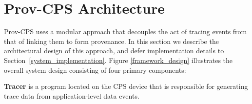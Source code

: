 %
%
%
%
%
%
%
%
% 
%


\section{Prov-CPS Architecture}
Prov-CPS uses a modular approach that decouples the act of tracing events from that of linking them to form provenance. In this section we describe the architectural design of this approach, and defer implementation details to Section~\ref{system_implementation}.  Figure \ref{framework_design} illustrates the overall system design consisting of four primary components:

 
 \textbf{Tracer} is a program located on the CPS device that is responsible for generating trace data from application-level data events. 
  
